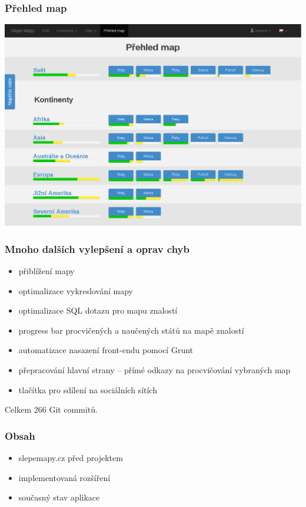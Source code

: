 \documentclass[xcolor=svgnames]{beamer}
\newcommand{\semitransp}[2][35]{\color{fg!#1}#2}
\begin{document}
\begin{frame}
	\frametitle{Přehled map}
   \includegraphics[width=\textwidth]{img/overview.png}
\end{frame}
\begin{frame}
  \frametitle{Mnoho dalších vylepšení a oprav chyb}
  \begin{itemize}
  \item přiblížení mapy
  \item optimalizace vykreslování mapy
  \item optimalizace SQL dotazu pro mapu znalostí
  \item progress bar procvičených a naučených států na mapě znalostí
  \item automatizace nasazení front-endu pomocí Grunt
  \item přepracování hlavní strany – přímé odkazy na procvičování vybraných map
  \item tlačítka pro sdílení na sociálních sítích
  \end{itemize}
   Celkem  266 Git commitů.
\end{frame}
\begin{frame}
	\frametitle{Obsah}
  \begin{itemize}
  \semitransp[20]{ 
    \huge \item slepemapy.cz před projektem
    \huge \item implementovaná rozšíření
  }
  \semitransp[100]{ 
  \huge \item současný stav aplikace
  }
  \end{itemize}
\end{frame}
\end{document}
